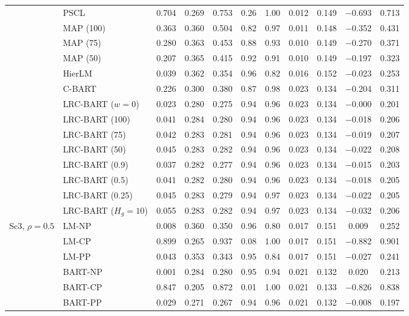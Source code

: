 \documentclass[11pt]{article}
\theoremstyle{definition}
\theoremstyle{plain}
\begin{document}
\begin{center}
\begin{longtable}{llccccccccc}
& PSCL & 0.704 & 0.269 & 0.753 & 0.26 & 1.00 & 0.012 & 0.149 & $-$0.693 & 0.713 \\
& MAP (100) & 0.363 & 0.360 & 0.504 & 0.82 & 0.97 & 0.011 & 0.148 & $-$0.352 & 0.431 \\
& MAP (75) & 0.280 & 0.363 & 0.453 & 0.88 & 0.93 & 0.010 & 0.149 & $-$0.270 & 0.371 \\
& MAP (50) & 0.207 & 0.365 & 0.415 & 0.92 & 0.91 & 0.010 & 0.149 & $-$0.197 & 0.323 \\
& HierLM & 0.039 & 0.362 & 0.354 & 0.96 & 0.82 & 0.016 & 0.152 & $-$0.023 & 0.253 \\
& C-BART & 0.226 & 0.300 & 0.380 & 0.87 & 0.98 & 0.023 & 0.134 & $-$0.204 & 0.311 \\
& LRC-BART ($w=0$) & 0.023 & 0.280 & 0.275 & 0.94 & 0.96 & 0.023 & 0.134 & $-$0.000 & 0.201 \\
& LRC-BART (100) & 0.041 & 0.284 & 0.280 & 0.94 & 0.96 & 0.023 & 0.134 & $-$0.018 & 0.206 \\
& LRC-BART (75) & 0.042 & 0.283 & 0.281 & 0.94 & 0.96 & 0.023 & 0.134 & $-$0.019 & 0.207 \\
& LRC-BART (50) & 0.045 & 0.283 & 0.282 & 0.94 & 0.96 & 0.023 & 0.134 & $-$0.022 & 0.208 \\
& LRC-BART (0.9) & 0.037 & 0.282 & 0.277 & 0.94 & 0.96 & 0.023 & 0.134 & $-$0.015 & 0.203 \\
& LRC-BART (0.5) & 0.041 & 0.282 & 0.280 & 0.94 & 0.96 & 0.023 & 0.134 & $-$0.018 & 0.205 \\
& LRC-BART (0.25) & 0.045 & 0.283 & 0.279 & 0.94 & 0.97 & 0.023 & 0.134 & $-$0.022 & 0.205 \\
& LRC-BART ($H_g=10$) & 0.055 & 0.283 & 0.282 & 0.94 & 0.97 & 0.023 & 0.134 & $-$0.032 & 0.206 \\
\midrule
\multirow{20}{*}{Sc3, $\rho=0.5$} & LM-NP & 0.008 & 0.360 & 0.350 & 0.96 & 0.80 & 0.017 & 0.151 & 0.009 & 0.252 \\
& LM-CP & 0.899 & 0.265 & 0.937 & 0.08 & 1.00 & 0.017 & 0.151 & $-$0.882 & 0.901 \\
& LM-PP & 0.043 & 0.353 & 0.343 & 0.95 & 0.84 & 0.017 & 0.151 & $-$0.027 & 0.241 \\
& BART-NP & 0.001 & 0.284 & 0.280 & 0.95 & 0.94 & 0.021 & 0.132 & 0.020 & 0.213 \\
& BART-CP & 0.847 & 0.205 & 0.872 & 0.01 & 1.00 & 0.021 & 0.133 & $-$0.826 & 0.838 \\
& BART-PP & 0.029 & 0.271 & 0.267 & 0.94 & 0.96 & 0.021 & 0.132 & $-$0.008 & 0.197 \\

\end{longtable}
\end{center}
\end{document}

